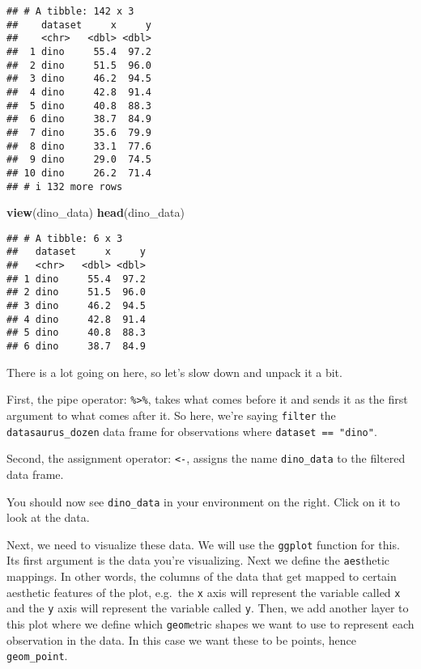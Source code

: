 \documentclass[
]{article}
\newenvironment{Shaded}{\begin{snugshade}}{\end{snugshade}}
\newcommand{\FunctionTok}[1]{\textcolor[rgb]{0.13,0.29,0.53}{\textbf{#1}}}
\newcommand{\NormalTok}[1]{#1}
\begin{document}
\begin{verbatim}
## # A tibble: 142 x 3
##    dataset     x     y
##    <chr>   <dbl> <dbl>
##  1 dino     55.4  97.2
##  2 dino     51.5  96.0
##  3 dino     46.2  94.5
##  4 dino     42.8  91.4
##  5 dino     40.8  88.3
##  6 dino     38.7  84.9
##  7 dino     35.6  79.9
##  8 dino     33.1  77.6
##  9 dino     29.0  74.5
## 10 dino     26.2  71.4
## # i 132 more rows
\end{verbatim}

\begin{Shaded}
\begin{Highlighting}[]
\FunctionTok{view}\NormalTok{(dino\_data)}
\FunctionTok{head}\NormalTok{(dino\_data)}
\end{Highlighting}
\end{Shaded}

\begin{verbatim}
## # A tibble: 6 x 3
##   dataset     x     y
##   <chr>   <dbl> <dbl>
## 1 dino     55.4  97.2
## 2 dino     51.5  96.0
## 3 dino     46.2  94.5
## 4 dino     42.8  91.4
## 5 dino     40.8  88.3
## 6 dino     38.7  84.9
\end{verbatim}

There is a lot going on here, so let's slow down and unpack it a bit.

First, the pipe operator: \texttt{\%\textgreater{}\%}, takes what comes
before it and sends it as the first argument to what comes after it. So
here, we're saying \texttt{filter} the \texttt{datasaurus\_dozen} data
frame for observations where \texttt{dataset\ ==\ "dino"}.

Second, the assignment operator: \texttt{\textless{}-}, assigns the name
\texttt{dino\_data} to the filtered data frame.

You should now see \texttt{dino\_data} in your environment on the right.
Click on it to look at the data.

Next, we need to visualize these data. We will use the \texttt{ggplot}
function for this. Its first argument is the data you're visualizing.
Next we define the \texttt{aes}thetic mappings. In other words, the
columns of the data that get mapped to certain aesthetic features of the
plot, e.g.~the \texttt{x} axis will represent the variable called
\texttt{x} and the \texttt{y} axis will represent the variable called
\texttt{y}. Then, we add another layer to this plot where we define
which \texttt{geom}etric shapes we want to use to represent each
observation in the data. In this case we want these to be points, hence
\texttt{geom\_point}.
\end{document}
